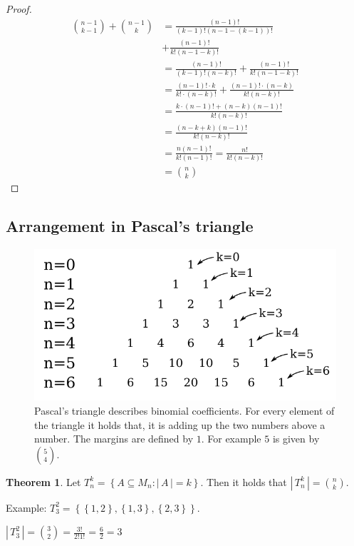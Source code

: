 \documentclass[a4paper,landscape,twocolumn]{article}
\theoremstyle{definition}
\newtheorem{theorem}{Theorem}
\newcommand\set[1]{\left\{#1\right\}}
\newcommand\card[1]{\left|\,#1\,\right|}
\begin{document}
\begin{proof}
  \begin{align*}
      \binom{n-1}{k-1} + \binom{n-1}{k}
          &= \frac{(n-1)!}{(k-1)! (n-1 - (k-1))!} \\
          &+ \frac{(n-1)!}{k! (n-1-k)!} \\
      &= \frac{(n-1)!}{(k-1)! (n-k)!} + \frac{(n-1)!}{k! (n-1-k)!} \\
      &= \frac{(n-1)! \cdot k}{k! \cdot (n-k)!} + \frac{(n-1)! \cdot (n-k)}{k! (n-k)!} \\
      &= \frac{k \cdot (n-1)! + (n-k)(n-1)!}{k! (n-k)!} \\
      &= \frac{(n-k+k)(n-1)!}{k! (n-k)!} \\
      &= \frac{n (n-1)!}{k!(n-1)!} = \frac{n!}{k! (n-k)!} \\
      &= \binom nk
  \end{align*}
\end{proof}

\subsection{Arrangement in Pascal's triangle}
\begin{figure}[!h]
  \begin{center}
    \includegraphics{img/pascals_triangle.pdf}
    \caption{
      Pascal's triangle describes binomial coefficients.
      For every element of the triangle it holds that,
      it is adding up the two numbers above a number.
      The margins are defined by $1$. For example $5$ is given by ${5 \choose 4}$.
    }
  \end{center}
\end{figure}

\begin{theorem}
  Let $T_n^k = \set{A \subseteq M_n: \card{A} = k}$.
  Then it holds that $\card{T_n^k} = \binom nk$.

  Example: $T_3^2 = \set{\set{1, 2}, \set{1, 3}, \set{2, 3}}$.

  $\card{T_3^2} = \binom 32 = \frac{3!}{2! 1!} = \frac 62 = 3$
\end{theorem}
\end{document}

